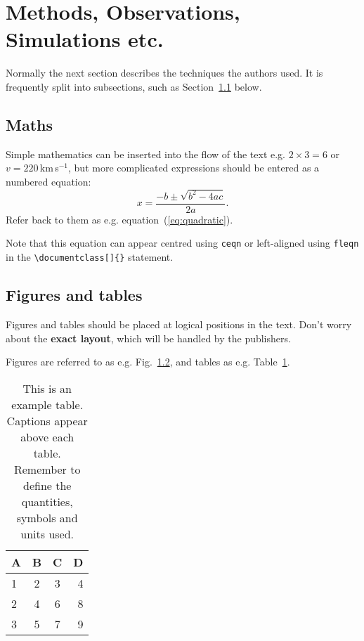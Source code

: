 \section{Methods, Observations, Simulations etc.}
\label{sec:method} %
Normally the next section describes the techniques the authors used.
It is frequently split into subsections, such as Section~\ref{sec:maths} below.
\subsection{Maths}
\label{sec:maths} %
Simple mathematics can be inserted into the flow of the text e.g. $2\times3=6$
or $v=220$\,km\,s$^{-1}$, but more complicated expressions should be entered
as a numbered equation:
    \begin{equation}
        x=\frac{-b\pm\sqrt{b^2-4ac}}{2a}.
    	\label{eq:quadratic}
    \end{equation}
Refer back to them as e.g. equation~(\ref{eq:quadratic}). 

Note that this equation can appear centred using 
\verb'ceqn' or left-aligned using \verb'fleqn' in the \verb'\documentclass[]{}' statement.

\subsection{Figures and tables}

Figures and tables should be placed at logical positions in the text. Don't worry about the\textbf{ exact layout}, which will be handled by the publishers.

Figures are referred to as e.g. Fig.~\ref{}, and tables as
e.g. Table~\ref{tab:example_table}.


\begin{table}
	\centering
	\caption{This is an example table. Captions appear above each table.
	Remember to define the quantities, symbols and units used.}
	\label{tab:example_table}
	\begin{tabular}{lccr} %
		\hline
		A & B & C & D\\
		\hline
		1 & 2 & 3 & 4\\
		2 & 4 & 6 & 8\\
		3 & 5 & 7 & 9\\
		\hline
	\end{tabular}
\end{table}

